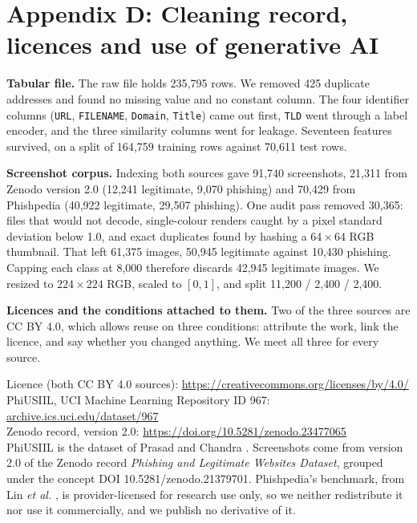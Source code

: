 \documentclass[11pt,journal,a4paper]{IEEEtran}
\begin{document}
\section*{Appendix D: Cleaning record, licences and use of generative AI}
\label{app:clean}

\textbf{Tabular file.} The raw file holds 235{,}795 rows. We removed 425 duplicate addresses and found no
missing value and no constant column. The four identifier columns (\texttt{URL}, \texttt{FILENAME},
\texttt{Domain}, \texttt{Title}) came out first, \texttt{TLD} went through a label encoder, and the three
similarity columns went for leakage. Seventeen features survived, on a split of 164{,}759 training rows
against 70{,}611 test rows.

\textbf{Screenshot corpus.} Indexing both sources gave 91{,}740 screenshots, 21{,}311 from Zenodo version
2.0 (12{,}241 legitimate, 9{,}070 phishing) and 70{,}429 from Phishpedia (40{,}922 legitimate, 29{,}507
phishing). One audit pass removed 30{,}365: files that would not decode, single-colour renders caught by a pixel
standard deviation below 1.0, and exact duplicates found by hashing a $64\times64$ RGB thumbnail. That left
61{,}375 images, 50{,}945 legitimate against 10{,}430 phishing. Capping each class at 8{,}000 therefore discards
42{,}945 legitimate images. We resized to $224\times224$ RGB, scaled to $[0,1]$, and split 11{,}200 / 2{,}400 /
2{,}400.

\textbf{Licences and the conditions attached to them.} Two of the three sources are CC BY 4.0, which allows
reuse on three conditions: attribute the work, link the licence, and say whether you changed anything. We meet all
three for every source.

\noindent Licence (both CC BY 4.0 sources): \url{https://creativecommons.org/licenses/by/4.0/}\\
PhiUSIIL, UCI Machine Learning Repository ID 967: \href{https://archive.ics.uci.edu/dataset/967/phiusiil+phishing+url+dataset}{archive.ics.uci.edu/dataset/967}\\
Zenodo record, version 2.0: \url{https://doi.org/10.5281/zenodo.23477065}\\

\noindent PhiUSIIL is the dataset of Prasad and Chandra \cite{prasad2024phiusiil}. Screenshots come from version 2.0 of the Zenodo record \emph{Phishing and Legitimate Websites Dataset}, grouped under the concept DOI
10.5281/zenodo.21379701. Phishpedia's benchmark, from Lin \emph{et al.} \cite{lin2021phishpedia}, is provider-licensed for research use only, so we neither redistribute it nor use it commercially, and we publish no
derivative of it.
\end{document}
